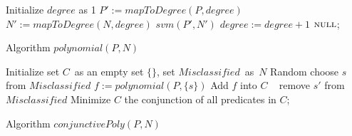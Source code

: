 \begin{algorithm}[t]
\SetAlgoVlined
\Indm
\Indp
    Initialize $degree$ as 1\;
     {
        $P' := \mathit{mapToDegree}(P, \mathit{degree})$\;
        $N' := \mathit{mapToDegree}(N, \mathit{degree})$\;
         {
            \Return $\mathit{svm}(P', N')$\;
        }
    	$\mathit{degree} := \mathit{degree} + 1$\;
    }
    \Return $\textsc{null}$;
\caption{Algorithm $\mathit{polynomial}(P,N)$}
\label{alg:polynomialSVM}
\end{algorithm}
\vspace{-2mm}
\begin{algorithm}[t]
\SetAlgoVlined
\Indm
\Indp
    Initialize set $C$\ as an empty set $\{\}$, set $\mathit{Misclassified}$\ as\ $N$\;
     {
        Random choose $s$ from $\mathit{Misclassified}$\;
        $f := \mathit{polynomial}(P, \{s\})$\;
        Add $f$ into $C$\;
         {\
             {
                remove $s'$ from $\mathit{Misclassified}$\;
            }
        }
    }
    Minimize $C$\;
    \Return the conjunction of all predicates in $C$;
\caption{Algorithm $\mathit{conjunctivePoly}(P, N)$}
\label{alg:conjunctiveSVM}
\end{algorithm}




